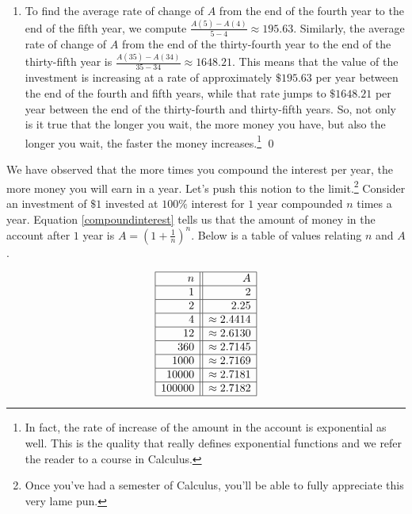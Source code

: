 \begin{ex}
\begin{enumerate}
\item  To find the average rate of change of $A$ from the end of the fourth year to the end of the fifth year, we compute $\frac{A(5)-A(4)}{5-4} \approx 195.63$.  Similarly, the average rate of change of $A$ from the end of the thirty-fourth year to the end of the thirty-fifth year is $\frac{A(35)-A(34)}{35-34} \approx 1648.21$.  This means that the value of the investment is increasing at a rate of approximately $\$195.63$ per year between the end of the fourth and fifth years, while that rate jumps to $\$1648.21$ per year between the end of the thirty-fourth and thirty-fifth years.  So, not only is it true that the longer you wait, the more money you have, but also the longer you wait, the faster the money increases.\footnote{In fact, the rate of increase of the amount in the account is exponential as well.  This is the quality that really defines exponential functions and we refer the reader to a course in Calculus.} \qed

\end{enumerate}

\end{ex}

We have observed that the more times you compound the interest per year, the more money you will earn in a year.  Let's push this notion to the limit.\footnote{Once you've had a semester of Calculus, you'll be able to fully appreciate this very lame pun.}  Consider an investment of $\$ 1$ invested at $100 \%$ interest for $1$ year compounded $n$ times a year.  Equation \ref{compoundinterest} tells us that the amount of money in the account after $1$ year is $A = \left(1+\frac{1}{n}\right)^{n}$.  Below is a table of values relating $n$ and $A$.

\[ \begin{array}{|r||r|}  

\hline

 n & A   \\ \hline
1  & 2  \\  \hline
2  & 2.25  \\  \hline
4 & \approx 2.4414  \\  \hline
12 & \approx 2.6130  \\  \hline
360  & \approx  2.7145 \\  \hline
1000  & \approx 2.7169 \\  \hline
10000  & \approx 2.7181  \\  \hline
100000 & \approx 2.7182  \\  \hline
\end{array} \]

